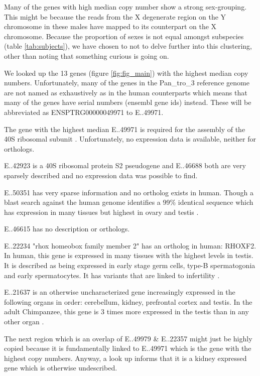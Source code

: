 Many of the genes with high median copy number show a strong sex-grouping. This might be because the reads from the X degenerate region on the Y chromosome in these males have mapped to its counterpart on the X chromosome. Because the proportion of sexes is not equal amongst subspecies (table \ref{tab:subjects}), we have chosen to not to delve further into this clustering, other than noting that something curious is going on. 

We looked up the 13 genes (figure \ref{fig:fig_main}) with the highest median copy numbers. Unfortunately, many of the genes in the Pan\_tro\_3 reference genome are not named as exhaustively as in the human counterparts which means that many of the genes have serial numbers (ensembl gene ids) instead. These will be abbreviated as ENSPTRG00000049971 to E..49971. 

The gene with the highest median \noindent E..49971 is required for the assembly of the 40S ribosomal subunit \cite{ensembl}. Unfortunately, no expression data is available, neither for orthologs.

E..42923 is a 40S ribosomal protein S2 pseudogene and E..46688 both are very sparsely described \cite{ensembl} and no expression data was possible to find.

E..50351 has very sparse information and no ortholog exists in human. Though a blast search against the human genome identifies a 99\% identical sequence which has expression in many tissues but highest in ovary and testis \cite{ensembl}. 

E..46615 has no description or orthologs.


E..22234 "rhox homeobox family member 2" has an ortholog in human: RHOXF2. In human, this gene is expressed in many tissues with the highest levels in testis. It is described as being expressed in early stage germ cells, type-B spermatogonia and early spermatocytes. It has variants that are linked to infertility \cite{10.1093/hmg/ddw313}.

E..21637 is an otherwise uncharacterized gene increasingly expressed in the following organs in order: cerebellum, kidney, prefrontal cortex and testis. In the adult Chimpanzee, this gene is 3 times more expressed in the testis than in any other organ \cite{10.1007/978-3-540-69828-9_12}.




The next region which is an overlap of E..49979 & E..22357 might just be highly copied because it is fundamentally linked to E..49971 which is the gene with the highest copy numbers. Anyway, a look up informs that it is a kidney expressed gene which is otherwise undescribed.


